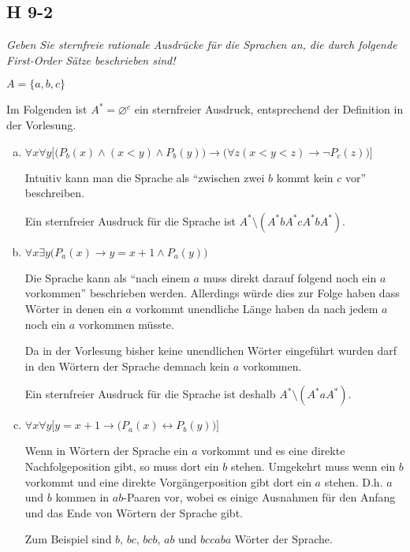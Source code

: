 \documentclass{scrartcl}
\begin{document}
\subsection{H 9-2}

\textsl{Geben Sie \emph{sternfreie rationale Ausdrücke} für die Sprachen an, die durch folgende First-Order Sätze beschrieben sind!}

$A = \big\{a,b,c\big\}$

Im Folgenden ist $A^* = \varnothing^c$ ein sternfreier Ausdruck, entsprechend der Definition in der Vorlesung.

\begin{enumerate}[(a)]
    \item $\forall x \forall y\Big[\big(P_b(x) \land (x < y) \land P_b(y)\big) \rightarrow \big(\forall z (x < y < z) \rightarrow \lnot P_c(z)\big)\Big]$

      Intuitiv kann man die Sprache als \enquote{zwischen zwei $b$ kommt kein $c$ vor} beschreiben.

      Ein sternfreier Ausdruck für die Sprache ist $A^* \setminus (A^* b A^* c A^* b A^*)$.

    \item $\forall x \exists y \Big( P_a(x) \rightarrow y = x+1 \land P_a(y)\Big)$

      Die Sprache kann als \enquote{nach einem $a$ muss direkt darauf folgend noch ein $a$ vorkommen} beschrieben werden. Allerdings würde dies zur Folge haben dass Wörter in denen ein $a$ vorkommt unendliche Länge haben da nach jedem $a$ noch ein $a$ vorkommen müsste.

      Da in der Vorlesung bisher keine unendlichen Wörter eingeführt wurden darf in den Wörtern der Sprache demnach kein $a$ vorkommen.

      Ein sternfreier Ausdruck für die Sprache ist deshalb $A^* \setminus (A^* a A^*)$.
    \item $\forall x \forall y \Big[ y = x+1 \rightarrow \big(P_a(x) \leftrightarrow P_b(y)\big)\Big]$

      Wenn in Wörtern der Sprache ein $a$ vorkommt und es eine direkte Nachfolgeposition gibt, so muss dort ein $b$ stehen. Umgekehrt muss wenn ein $b$ vorkommt und eine direkte Vorgängerposition gibt dort ein $a$ stehen. D.h. $a$ und $b$ kommen in $ab$-Paaren vor, wobei es einige Ausnahmen für den Anfang und das Ende von Wörtern der Sprache gibt.

      Zum Beispiel sind $b$, $bc$, $bcb$, $ab$ und $bccaba$ Wörter der Sprache.


\end{enumerate}
\end{document}
